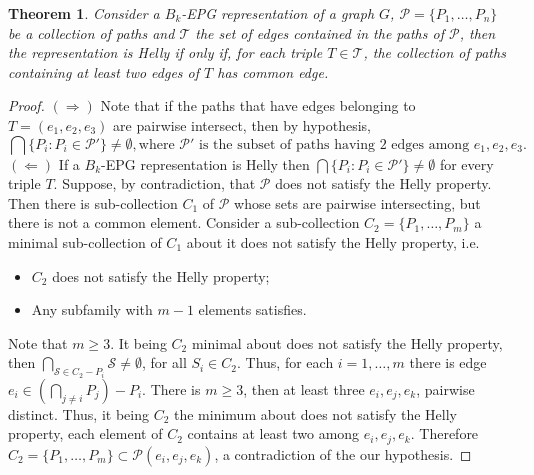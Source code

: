 \documentclass[a4paper,11pt]{article}
\newtheorem{theorem}{Theorem}
\begin{document}

\begin{theorem}
Consider a $B_k$-EPG representation of a graph $G$, $\mathcal{P}= \{P_1, \dots, P_n\}$ be a collection of paths and $\mathcal{T}$ the set of edges contained in the paths of $\mathcal{P}$, then the representation is Helly if only if, for each triple $T\in \mathcal{T}$, the collection of paths containing at least two edges of $T$ has common edge.
\end{theorem}

\begin{proof}
$(\Rightarrow)$ Note that if the paths that have edges belonging to $T=(e_1, e_2, e_3)$ are pairwise intersect, then by hypothesis,
$$\bigcap \{P_i: P_i	\in \mathcal{P'} \} \neq \emptyset , \mbox{where } \mathcal{P'} \mbox{ is the subset of paths having 2 edges among } e_1, e_2,e_3.$$
$(\Leftarrow)$ If a $B_k$-EPG representation is Helly then $\bigcap \{P_i: P_i	\in \mathcal{P'}\} \neq \emptyset$  for every triple $T$.%
Suppose, by contradiction, that $\mathcal{P}$ does not satisfy the Helly property. Then there is sub-collection $C_1$ of $ \mathcal{P}$ whose sets are pairwise intersecting, but there is not a common element. Consider a sub-collection $C_2 = \{P_1, \dots, P_m\}$ a minimal sub-collection of $C_1$ about  it does not satisfy the Helly property, i.e.
\begin{itemize}
\item $C_2$ does not satisfy the Helly property;
\item Any subfamily with $m-1$ elements satisfies.
\end{itemize}
Note that $m\geq 3$. It being $C_2$ minimal about does not satisfy the Helly property, then $\bigcap _{ \mathcal{S} \in C_2-P_i	} \mathcal{S} \neq \emptyset$, for all $S_i \in C_2$. Thus,  for each $i=1, \dots, m$ there is edge $e_i \in (\bigcap _{j\neq i}P_j)-P_i$.
There is $m\geq 3$, then at least three $e_i, e_j, e_k$, pairwise distinct. Thus, it being $C_2$ the minimum about does not satisfy the Helly property, each element of $C_2$ contains at least two among $e_i, e_j, e_k$.  Therefore $C_2 = \{P_1, \dots, P_m\} \subset \mathcal{P}(e_i, e_j, e_k)$, a contradiction of the our hypothesis.
\end{proof}
\end{document}
